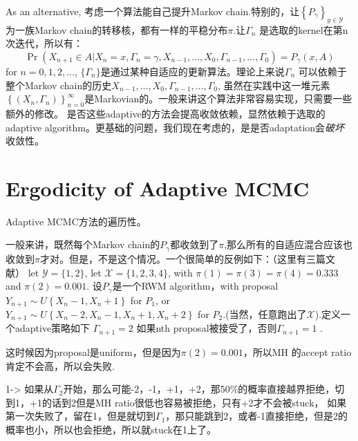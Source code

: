 \documentclass[
]{book}
\theoremstyle{definition}
\theoremstyle{definition}
\theoremstyle{definition}
\theoremstyle{remark}
\begin{document}
As an alternative, 考虑一个算法能自己提升Markov chain.特别的，让\(\left\{P_{\gamma}\right\}_{y \in \mathcal{Y}}\) 为一族Markov chain的转移核，都有一样的平稳分布\(\pi\).让\(\Gamma_n\) 是选取的kernel在第n次迭代，所以有：
\[
\operatorname{Pr}\left(X_{n+1} \in A | X_{n}=x, \Gamma_{n}=\gamma, X_{n-1}, \ldots, X_{0}, \Gamma_{n-1}, \ldots, \Gamma_{0}\right)=P_{\gamma}(x, A)
\]
for \(n=0,1,2,...\), \(\{\Gamma_n\}\)是通过某种自适应的更新算法。理论上来说\(\Gamma_n\) 可以依赖于整个Markov chain的历史\(X_{n-1}, \ldots, X_{0}, \Gamma_{n-1}, \ldots, \Gamma_{0}\), 虽然在实践中这一堆元素\(\left\{\left(X_{n}, \Gamma_{n}\right)\right\}_{n=0}^{\infty}\)是Markovian的。一般来讲这个算法非常容易实现，只需要一些额外的修改。
是否这些adaptive的方法会提高收敛依赖，显然依赖于选取的adaptive algorithm。更基础的问题，我们现在考虑的，是是否adaptation会\emph{破坏} 收敛性。

\hypertarget{ergodicity-of-adaptive-mcmc}{%
\section{Ergodicity of Adaptive MCMC}\label{ergodicity-of-adaptive-mcmc}}

Adaptive MCMC方法的遍历性。

一般来讲，既然每个Markov chain的\(P_{\gamma}\)都收敛到了\(\pi\),那么所有的自适应混合应该也收敛到\(\pi\)才对。但是，不是这个情况。一个很简单的反例如下：（这里有三篇文献）
let \(\mathcal{Y}=\{1,2\}\), let \(\mathcal{X}=\{1,2,3,4\}\), with \(\pi(1)=\pi(3)=\pi(4)=0.333\) and \(\pi(2)=0.001\). 设\(P_\gamma\)是一个RWM algorithm，with proposal \(Y_{n+1} \sim U\left\{X_{n}-1, X_{n}+1\right\}\) for \(P_1\), or \(Y_{n+1} \sim U\left\{X_{n}-2, X_{n}-1, X_{n}+1, X_{n}+2\right\}\) for \(P_2\).(当然，任意跑出了\(\mathcal X\)).定义一个adaptive策略如下
\(\Gamma_{n+1}=2\) 如果nth proposal被接受了，否则\(\Gamma_{n+1}=1\) .

这时候因为proposal是uniform，但是因为\(\pi(2)=0.001\)，所以MH 的accept ratio肯定不会高，所以会失败.

1-\textgreater{} 如果从\(\Gamma_2\)开始，那么可能-2，-1，+1，+2，那50\%的概率直接越界拒绝，切到1，+1的话到2但是MH ratio很低也容易被拒绝，只有+2才不会被stuck，
如果第一次失败了，留在1，但是就切到\(\Gamma_1\)，那只能跳到2，或者-1直接拒绝，但是2的概率也小，所以也会拒绝，所以就stuck在1上了。
\end{document}
